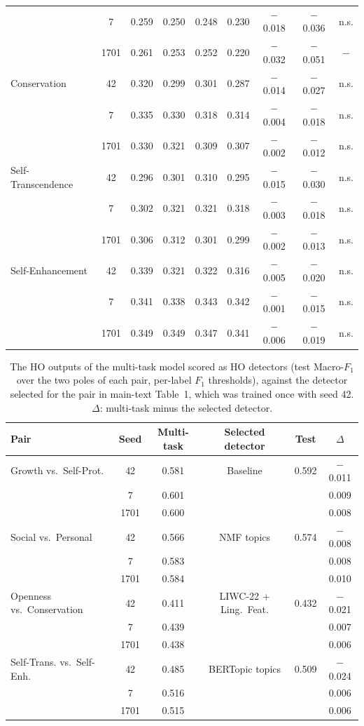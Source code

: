 \begin{table}[!htbp]
\begin{tabularx}{\textwidth}{Xcccccccc}
 & 7 & 0.259 & 0.250 & 0.248 & 0.230 & $-$0.018 & $-$0.036 & n.s. \\
 & 1701 & 0.261 & 0.253 & 0.252 & 0.220 & $-$0.032 & $-$0.051 & $-$ \\
Conservation & 42 & 0.320 & 0.299 & 0.301 & 0.287 & $-$0.014 & $-$0.027 & n.s. \\
 & 7 & 0.335 & 0.330 & 0.318 & 0.314 & $-$0.004 & $-$0.018 & n.s. \\
 & 1701 & 0.330 & 0.321 & 0.309 & 0.307 & $-$0.002 & $-$0.012 & n.s. \\
Self-Transcendence & 42 & 0.296 & 0.301 & 0.310 & 0.295 & $-$0.015 & $-$0.030 & n.s. \\
 & 7 & 0.302 & 0.321 & 0.321 & 0.318 & $-$0.003 & $-$0.018 & n.s. \\
 & 1701 & 0.306 & 0.312 & 0.301 & 0.299 & $-$0.002 & $-$0.013 & n.s. \\
Self-Enhancement & 42 & 0.339 & 0.321 & 0.322 & 0.316 & $-$0.005 & $-$0.020 & n.s. \\
 & 7 & 0.341 & 0.338 & 0.343 & 0.342 & $-$0.001 & $-$0.015 & n.s. \\
 & 1701 & 0.349 & 0.349 & 0.347 & 0.341 & $-$0.006 & $-$0.019 & n.s. \\
\hline
\end{tabularx}
\end{table}

\begin{table}[!htbp]
\centering
\footnotesize
\caption{The HO outputs of the multi-task model scored as HO detectors (test Macro-$F_1$ over the two poles of each pair, per-label $F_1$ thresholds), against the detector selected for the pair in main-text Table~1, which was trained once with seed 42. $\Delta$: multi-task minus the selected detector.}
\label{tab:s8-multitask-ho}
\begin{tabularx}{\textwidth}{Xccccc}
\hline
\textbf{Pair} & \textbf{Seed} & \textbf{Multi-task} & \textbf{Selected detector} & \textbf{Test} & \textbf{$\Delta$} \\
\hline
Growth vs.\ Self-Prot. & 42 & 0.581 & Baseline & 0.592 & $-$0.011 \\
 & 7 & 0.601 &  &  & 0.009 \\
 & 1701 & 0.600 &  &  & 0.008 \\
Social vs.\ Personal & 42 & 0.566 & NMF topics & 0.574 & $-$0.008 \\
 & 7 & 0.583 &  &  & 0.008 \\
 & 1701 & 0.584 &  &  & 0.010 \\
Openness vs.\ Conservation & 42 & 0.411 & LIWC-22 + Ling.\ Feat. & 0.432 & $-$0.021 \\
 & 7 & 0.439 &  &  & 0.007 \\
 & 1701 & 0.438 &  &  & 0.006 \\
Self-Trans. vs.\ Self-Enh. & 42 & 0.485 & BERTopic topics & 0.509 & $-$0.024 \\
 & 7 & 0.516 &  &  & 0.006 \\
 & 1701 & 0.515 &  &  & 0.006 \\
\hline
\end{tabularx}
\end{table}


